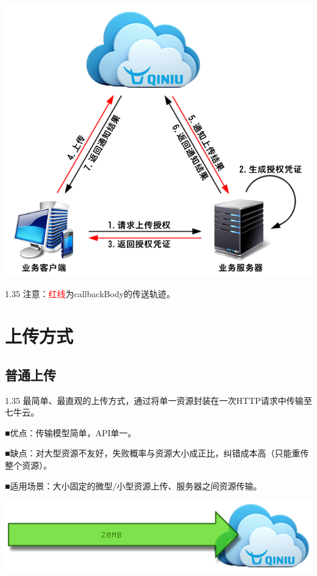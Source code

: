 \documentclass[11pt, oneside]{book}
\newcommand{\qpara}[1]{
\vspace{0.2em}
\begin{spacing}{1.35}
\noindent
#1\par
\end{spacing}
\vspace{0.2em}
}
\newcommand{\qblock}[1]{
\vspace{0.1em}
\noindent
#1\par
\vspace{0.1em}
}
\begin{document}
\begin{center}
\includegraphics[scale=1]{../pics/upload/ugc_upload_callback.png}
\end{center}

\qpara{注意：\textcolor{red}{红线}为callbackBody的传送轨迹。}

\chapter{上传方式}

\section{普通上传}

\qpara{最简单、最直观的上传方式，通过将单一资源封装在一次HTTP请求中传输至七牛云。}
\qblock{■\thinspace 优点：传输模型简单，API单一。}
\qblock{■\thinspace 缺点：对大型资源不友好，失败概率与资源大小成正比，纠错成本高（只能重传整个资源）。}
\qblock{■\thinspace 适用场景：大小固定的微型/小型资源上传、服务器之间资源传输。}

\begin{center}
\includegraphics[scale=1]{../pics/upload/one_put.png}
\end{center}
\end{document}
